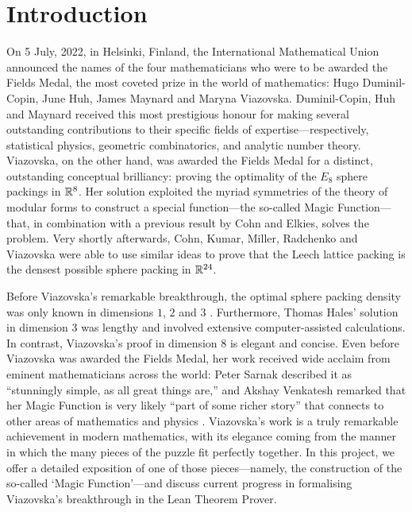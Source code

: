 \chapter{Introduction}
\label{Ch1:Chapter}
\thispagestyle{empty}

On 5 July, 2022, in Helsinki, Finland, the International Mathematical Union announced the names of the four mathematicians who were to be awarded the Fields Medal, the most coveted prize in the world of mathematics: Hugo Duminil-Copin, June Huh, James Maynard and Maryna Viazovska. Duminil-Copin, Huh and Maynard received this most prestigious honour for making several outstanding contributions to their specific fields of expertise---respectively, statistical physics, geometric combinatorics, and analytic number theory. Viazovska, on the other hand, was awarded the Fields Medal for a distinct, outstanding conceptual brilliancy: proving the optimality of the $E_8$ sphere packings in $\mathbb{R}^8$. Her solution exploited the myriad symmetries of the theory of modular forms to construct a special function---the so-called Magic Function---that, in combination with a previous result by Cohn and Elkies, solves the problem. Very shortly afterwards, Cohn, Kumar, Miller, Radchenko and Viazovska were able to use similar ideas to prove that the Leech lattice packing is the densest possible sphere packing in $\mathbb{R}^{24}$.

Before Viazovska's remarkable breakthrough, the optimal sphere packing density was only known in dimensions $1$, $2$ and $3$ \cite{CohnOnViazovskaICM}. Furthermore, Thomas Hales' solution in dimension $3$ \cite{HalesKeplerInformal} was lengthy and involved extensive computer-assisted calculations. In contrast, Viazovska's proof in dimension $8$ is elegant and concise. Even before Viazovska was awarded the Fields Medal, her work received wide acclaim from eminent mathematicians across the world: Peter Sarnak described it as ``stunningly simple, as all great things are,'' and Akshay Venkatesh remarked that her Magic Function is very likely ``part of some richer story'' that connects to other areas of mathematics and physics \cite{QuantaPiece}. Viazovska's work is a truly remarkable achievement in modern mathematics, with its elegance coming from the manner in which the many pieces of the puzzle fit perfectly together. In this project, we offer a detailed exposition of one of those pieces---namely, the construction of the so-called `Magic Function'---and discuss current progress in formalising Viazovska's breakthrough in the Lean Theorem Prover.



